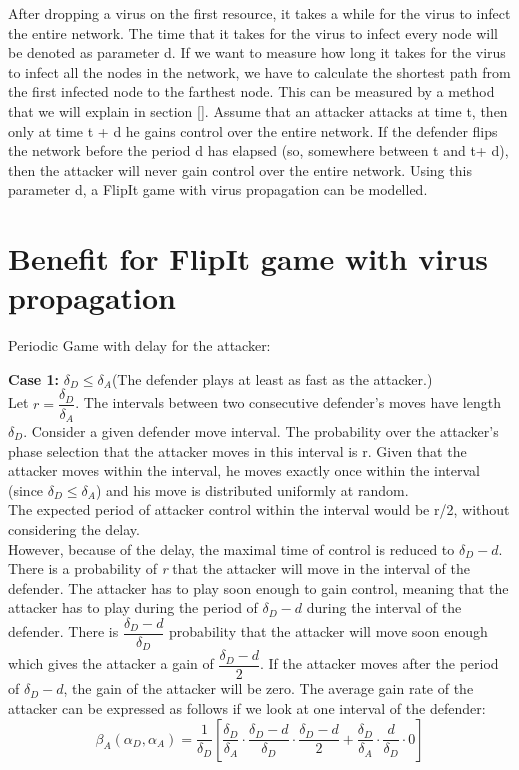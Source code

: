 After dropping a virus on the first resource, it takes a while for the virus to infect
the entire network. The time that it takes for the virus to infect every node will be
denoted as parameter d. If we want to measure how long it takes for the virus to
infect all the nodes in the network, we have to calculate the shortest path from the
first infected node to the farthest node. This can be measured by a method that we
will explain in section []. Assume that an attacker attacks at time t, then only at time t + d he gains control over the entire network. If the defender flips the network before the period d has elapsed (so, somewhere between t and t+ d), then the attacker will never gain control over the entire network. Using this parameter d, a FlipIt game with virus propagation
can be modelled. 


\section{Benefit for FlipIt game with virus propagation}

Periodic Game with delay for the attacker:

\textbf{Case 1:} $\delta_{D} \leq \delta_{A} $(The defender plays at least as fast as the attacker.) \\

Let $r = \dfrac{\delta_{D}}{ \delta_{A} }$. The intervals between two consecutive defender's moves have length $\delta_{D}$. Consider a given defender move interval. The probability over the attacker's phase selection that the attacker moves in this interval is r. Given that the attacker moves within the interval, he moves exactly once within the interval (since $\delta_{D} \leq \delta_{A} $) and his move is distributed uniformly at random. \\

The expected period of attacker control within the interval would be r/2, without considering the delay. \\

However, because of the delay, the maximal time of control is reduced to $\delta_{D}-d$. There is a probability of \textit{r} that the attacker will move in the interval of the defender. The attacker has to play soon enough to gain control, meaning that the attacker has to play during the period of $\delta_{D}-d$ during the interval of the defender. There is $\dfrac{\delta_{D}-d}{\delta_{D}}$ probability that the attacker will move soon enough which gives the attacker a gain of $\dfrac{\delta_{D}-d}{2}$. If the attacker moves after the period of $\delta_{D}-d$, the gain of the attacker will be zero. The average gain rate of the attacker can be expressed as follows if we look at one interval of the defender:
\begin{equation}\label{first}
\beta_{A}(\alpha_{D},\alpha_{A}) = \dfrac {1}{\delta_{D}} [ \dfrac{\delta_{D}}{\delta_{A}} \cdot \dfrac{\delta_{D}-d}{\delta_{D}} \cdot \dfrac{\delta_{D}-d}{2} + \dfrac{\delta_{D}}{\delta_{A}} \cdot \dfrac{d}{\delta_{D}} \cdot 0 ]
\end{equation}

